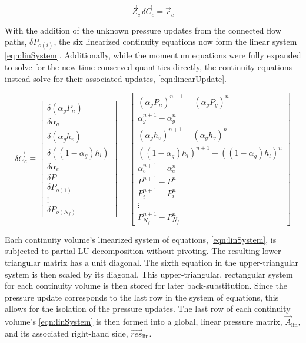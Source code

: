 \begin{equation}
\label{eqn:linSystem}
\vec{Z}_{c}\, \delta \vec{C}_{c} = \vec{r}_{c}
\end{equation}

With the addition of the unknown pressure updates from the connected flow paths, $\delta P_{o(i)}$,  the six linearized continuity equations now form the linear system \eqref{eqn:linSystem}.
Additionally, while the momentum equations were fully expanded to solve for the new-time conserved quantities directly, the continuity equations instead solve for their associated updates, \eqref{eqn:linearUpdate}.

\begin{equation}
\label{eqn:linearUpdate}
\delta \vec{C}_{c} \equiv 
\begin{bmatrix}
\delta ( \alpha_{g} P_{n} ) \\
\delta \alpha_{g} \\
\delta ( \alpha_{g} h_v ) \\
\delta ( (1 - \alpha_{g} ) h_l ) \\
\delta \alpha_{e} \\
\delta P \\ 
\delta P_{o(1)} \\
\vdots \\
\delta P_{o(N_{f})}
\end{bmatrix}
=
\begin{bmatrix}
( \alpha_{g} P_{n})^{n+1} - (\alpha_{g} P_{g} )^{n} \\
\alpha^{n+1}_{g} - \alpha^{n}_{g} \\
( \alpha_{g} h_{v} )^{n+1} - ( \alpha_{g} h_{v} )^{n} \\
( ( 1 - \alpha_{g} ) h_{l} )^{n+1} - ( ( 1 - \alpha_{g} ) h_{l} )^{n} \\
\alpha^{n+1}_{e} - \alpha^{n}_{e} \\
 P^{n+1} - P^{n} \\
 P_{i}^{n+1} - P_{i}^{n} \\
 \vdots \\
 P_{N_{f}}^{n+1} - P_{N_{f}}^{n}
\end{bmatrix}
\end{equation}

Each continuity volume's linearized system of equations, \eqref{eqn:linSystem}, is subjected to partial LU decomposition without pivoting.
The resulting lower-triangular matrix has a unit diagonal.
The sixth equation in the upper-triangular system is then scaled by its diagonal.
This upper-triangular, rectangular system for each continuity volume is then stored for later back-substitution.
Since the pressure update corresponds to the last row in the system of equations, this allows for the isolation of the pressure updates.
The last row of each continuity volume's \eqref{eqn:linSystem} is then formed into a global, linear pressure matrix, $\vec{A}_{\text{lin}}$, and its associated right-hand side, $\vec{res}_{\text{lin}}$.

